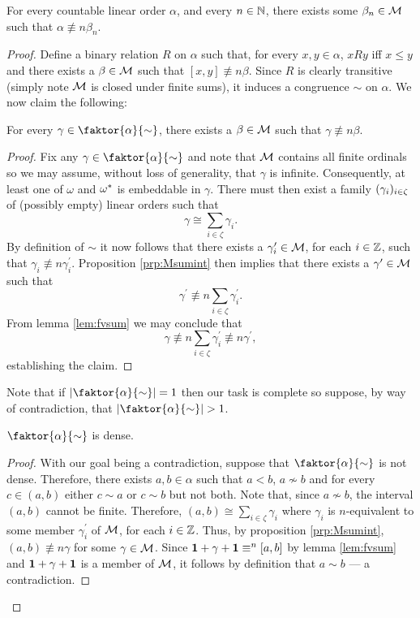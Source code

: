 \begin{thm}
	For every countable linear order $\alpha$, and every $n\in\mathbb{N}$, there exists some $\beta_n\in\mathcal{M}$ such that $\alpha\nequiv{n}\beta_n$.
\end{thm}
\begin{proof}
	Define a binary relation $R$ on $\alpha$ such that, for every $x,y\in\alpha$, $xRy$ iff $x\leq y$ and there exists a $\beta\in\mathcal{M}$ such that $[x,y]\nequiv{n}\beta$.  Since $R$ is clearly transitive (simply note $\mathcal{M}$ is closed under finite sums), it induces a congruence $\sim$ on $\alpha$.    We now claim the following:
	\begin{claim}
		For every $\gamma\in\faktor{\alpha}{\sim}$, there exists a $\beta\in\mathcal{M}$ such that $\gamma\nequiv{n}\beta$.
	\end{claim}
	\begin{proof}
		Fix any $\gamma\in\faktor{\alpha}{\sim}$ and note that $\mathcal{M}$ contains all finite ordinals so we may assume, without loss of generality, that $\gamma$ is infinite.  Consequently, at least one of $\omega$ and ${\omega}^\ast$ is embeddable in $\gamma$.  There must then exist a family $(\gamma_i)_{i\in\zeta}$ of (possibly empty) linear orders such that
		\begin{equation}
			\gamma\cong\sum_{i\in\zeta}\gamma_i.
		\end{equation}
		By definition of $\sim$ it now follows that there exists a $\gamma_i^\prime\in\mathcal{M}$, for each $i\in\mathbb{Z}$, such that $\gamma_i\nequiv{n}\gamma_i^\prime$.  Proposition \ref{prp:Msumint} then implies that there exists a $\gamma^\prime\in\mathcal{M}$ such that
		\begin{equation}
			\gamma^\prime\nequiv{n}\sum_{i\in\zeta}\gamma_i^\prime.
		\end{equation}
		From lemma \ref{lem:fvsum} we may conclude that
		\begin{equation}
			\gamma\nequiv{n}\sum_{i\in\zeta}\gamma_i^\prime\nequiv{n}\gamma^\prime,
		\end{equation}
		establishing the claim.
	\end{proof}

	Note that if $\card{\faktor{\alpha}{\sim}}=1$ then our task is complete so suppose, by way of contradiction, that $\card{\faktor{\alpha}{\sim}}>1$.
	\begin{claim}
		$\faktor{\alpha}{\sim}$ is dense.
	\end{claim}
	\begin{proof}
		With our goal being a contradiction, suppose that $\faktor{\alpha}{\sim}$ is not dense.  Therefore, there exists $a,b\in\alpha$ such that $a<b$, $a\not\sim b$ and for every $c\in(a,b)$ either $c\sim a$ or $c\sim b$ but not both.  Note that, since $a\not\sim b$, the interval $(a,b)$ cannot be finite.  Therefore, $(a,b)\cong\sum_{i\in\zeta}\gamma_i$ where $\gamma_i$ is $n$-equivalent to some member $\gamma_i^\prime$ of $\mathcal{M}$, for each $i\in\mathbb{Z}$.  Thus, by proposition \ref{prp:Msumint}, $(a,b)\nequiv{n}\gamma$ for some $\gamma\in\mathcal{M}$.  Since $\mathbf{1}+\gamma+\mathbf{1}\equiv^n[a,b]$ by lemma \ref{lem:fvsum} and $\mathbf{1}+\gamma+\mathbf{1}$ is a member of $\mathcal{M}$, it follows by definition that $a\sim b$ --- a contradiction.
	\end{proof}


\end{proof}
